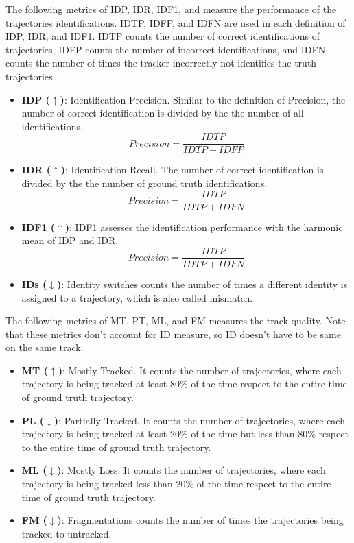 The following metrics of IDP, IDR, IDF1, and measure the performance of the trajectories identifications. IDTP, IDFP, and IDFN are used in each definition of IDP, IDR, and IDF1. IDTP counts the number of correct identifications of trajectories, IDFP counts the number of incorrect identifications, and IDFN counts the number of times the tracker incorrectly not identifies the truth trajectories.
\begin{itemize}

\item \textbf{IDP ($\uparrow$)}: Identification Precision. Similar to the definition of Precision, the number of correct identification is divided by the the number of all identifications.
\begin{equation}
Precision = \frac{IDTP}{IDTP + IDFP}
\end{equation}

\item \textbf{IDR ($\uparrow$)}: Identification Recall. The number of correct identification is divided by the the number of ground truth identifications.
\begin{equation}
Precision = \frac{IDTP}{IDTP + IDFN}
\end{equation}

\item \textbf{IDF1 ($\uparrow$)}: IDF1 assesses the identification performance with the harmonic mean of IDP and IDR. 
\begin{equation}
Precision = \frac{IDTP}{IDTP + IDFN}
\end{equation}

\item \textbf{IDs ($\downarrow$)}: Identity switches counts the number of times a different identity is assigned to a trajectory, which is also called mismatch.
\end{itemize}


The following metrics of MT, PT, ML, and FM measures the track quality. Note that these metrics don't account for ID measure, so ID doesn't have to be same on the same track.
\begin{itemize}

\item \textbf{MT ($\uparrow$)}: Mostly Tracked. It counts the number of trajectories, where each trajectory is being tracked at least 80\% of the time respect to the entire time of ground truth trajectory.

\item \textbf{PL ($\downarrow$)}: Partially Tracked. It counts the number of trajectories, where each trajectory is being tracked at least 20\% of the time but less than 80\% respect to the entire time of ground truth trajectory.

\item \textbf{ML ($\downarrow$)}: Mostly Loss. It counts the number of trajectories, where each trajectory is being tracked less than 20\% of the time respect to the entire time of ground truth trajectory.

\item \textbf{FM ($\downarrow$)}: Fragmentations counts the number of times the trajectories being tracked to untracked.
\end{itemize}


